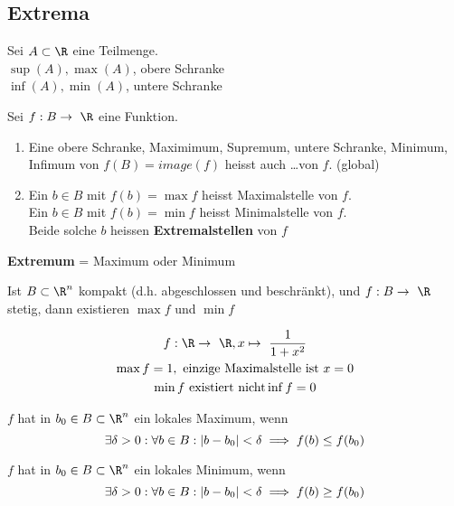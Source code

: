 \subsection{Extrema}
Sei $A \subset \R$ eine Teilmenge.\\
$\sup(A), \max(A)$, obere Schranke \\
$\inf(A), \min(A)$, untere Schranke \\
\begin{def*}[note = Extremalstelle , index = Extremalstelle]
Sei $f: B \rightarrow \R$ eine Funktion.
\begin{enumerate}[label = \alph*)]
	\item Eine obere Schranke, Maximimum, Supremum, untere Schranke, Minimum, Infimum von $f(B) = image(f)$ heisst auch \dots von $f$. (global)\\
	\item Ein $b \in B$ mit $f(b) = \max f$ heisst Maximalstelle von $f$. \\
		Ein $b \in B$ mit $f(b) = \min f$ heisst Minimalstelle von $f$. \\
		Beide solche $b$ heissen \textbf{Extremalstellen} von $f$
\end{enumerate}
\end{def*}
\begin{def*}[note = Extremum , index = Extremum]
	\textbf{Extremum} = Maximum oder Minimum
\end{def*}
\begin{satz*}
	Ist $B \subset \R^n$ kompakt (d.h. abgeschlossen und beschränkt), und $f: B \rightarrow \R$ stetig, dann existieren $\max f$ und $\min f$
\end{satz*}
\begin{bsp*}
	\begin{gather*}
		f: \R \rightarrow \R , x \mapsto \frac{1}{1+x^2} \\
		\max f = 1, \text{ einzige Maximalstelle ist } x = 0 \\
		\min f \text{ existiert nicht}
		\inf f = 0
	\end{gather*}
\end{bsp*}
\begin{def*}[note = lokales Maximum , index = Minimum!lokales]
	$f$ hat in $b_0 \in B \subset \R^n$ ein lokales Maximum, wenn
	\[ \exists \delta > 0 : \forall b \in B : \abs{b-b_0} < \delta \implies f(b) \leq f(b_0) \]
\end{def*}
\begin{def*}[note = lokales Minimum , index = Maximum!lokales]
	$f$ hat in $b_0 \in B \subset \R^n$ ein lokales Minimum, wenn
	\[ \exists \delta > 0 : \forall b \in B : \abs{b-b_0} < \delta \implies f(b) \geq f(b_0) \]
\end{def*}
